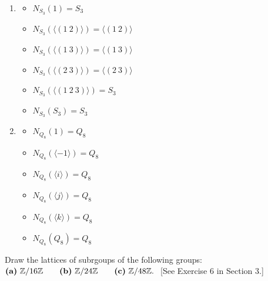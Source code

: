\begin{solution}
    \begin{enumerate}[label = \textbf{(\alph*)}]
        \item \begin{multicols}{2}\begin{itemize}
            \item $N_{S_3}(1) = S_3$
            \item $N_{S_3}(\langle (1 \ 2) \rangle) = \langle (1 \ 2) \rangle$
            \item $N_{S_3}(\langle (1 \ 3) \rangle) = \langle (1 \ 3) \rangle$
            \item $N_{S_3}(\langle (2 \ 3) \rangle) = \langle (2 \ 3) \rangle$
            \item $N_{S_3}(\langle (1 \ 2 \ 3) \rangle) = S_3$
            \item $N_{S_3}(S_3) = S_3$
        \end{itemize}
        \end{multicols}
        \item \begin{multicols}{2}\begin{itemize}
            \item $N_{Q_8}(1) = Q_8$
            \item $N_{Q_8}(\langle -1 \rangle) = Q_8$
            \item $N_{Q_8}(\langle i \rangle) = Q_8$
            \item $N_{Q_8}(\langle j \rangle) = Q_8$
            \item $N_{Q_8}(\langle k \rangle) = Q_8$
            \item $N_{Q_8}(Q_8) = Q_8$
        \end{itemize}
        \end{multicols}
    \end{enumerate}
\end{solution}

\begin{exercise}
    Draw the lattices of subrgoups of the following groups:\\
    $\textbf{(a)} \ \Z{16} \qquad \textbf{(b)} \ \Z{24} \qquad \textbf{(c)} \ \Z{48}. \ $ [See Exercise 6 in Section 3.]\\ 
\end{exercise}

